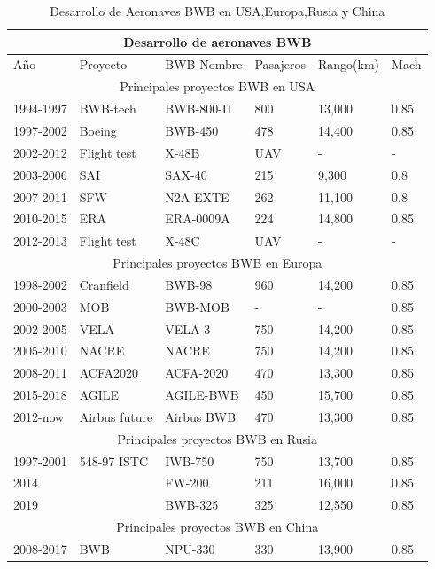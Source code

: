 \begin{table}[!t]
\caption{Desarrollo de Aeronaves BWB en USA,Europa,Rusia y China \cite{CHEN2019}}
\label{tab: Desarrollos BWB en el mundo}
\centering
\begin{tabular}{ |p{1.9cm}|p{2.2cm}|p{2.5cm}|p{1.8cm}|p{1.9cm}|p{1.6cm}|  }
\hline
\multicolumn{6}{|c|}{Desarrollo de aeronaves BWB} \\
\hline
Año & Proyecto & BWB-Nombre & Pasajeros & Rango(km) & Mach \\
\hline
\multicolumn{6}{|c|}{Principales proyectos BWB en USA} \\
\hline
1994-1997 & BWB-tech & BWB-800-II & 800 & 13,000 & 0.85 \\
1997-2002 & Boeing & BWB-450 & 478 & 14,400 & 0.85 \\
2002-2012 & Flight test & X-48B & UAV & - & - \\
2003-2006 & SAI & SAX-40 & 215 & 9,300 & 0.8 \\
2007-2011 & SFW & N2A-EXTE & 262 & 11,100 & 0.8 \\
2010-2015 & ERA & ERA-0009A & 224 & 14,800 & 0.85   \\
2012-2013 & Flight test & X-48C & UAV & - & - \\
\hline
\multicolumn{6}{|c|}{Principales proyectos BWB en Europa} \\
\hline
1998-2002 & Cranfield & BWB-98 & 960 & 14,200 & 0.85 \\
2000-2003 & MOB & BWB-MOB & - & - & 0.85 \\
2002-2005 & VELA & VELA-3 & 750 & 14,200 & 0.85 \\
2005-2010 & NACRE & NACRE & 750 & 14,200 & 0.85 \\
2008-2011 & ACFA2020 & ACFA-2020 & 470 & 13,300 & 0.85 \\
2015-2018 & AGILE & AGILE-BWB & 450 & 15,700 & 0.85 \\
2012-now & Airbus future & Airbus BWB & 470 & 13,300 & 0.85 \\
\hline
\multicolumn{6}{|c|}{Principales proyectos BWB en Rusia} \\
\hline
1997-2001 & 548-97 ISTC & IWB-750 & 750 & 13,700 & 0.85 \\
2014 &   & FW-200 & 211 & 16,000 & 0.85 \\
2019 &  & BWB-325 & 325 & 12,550 & 0.85 \\
\hline
\multicolumn{6}{|c|}{Principales proyectos BWB en China} \\
\hline
2008-2017 & BWB & NPU-330 & 330 & 13,900 & 0.85 \\
\hline
\end{tabular}
\end{table}


